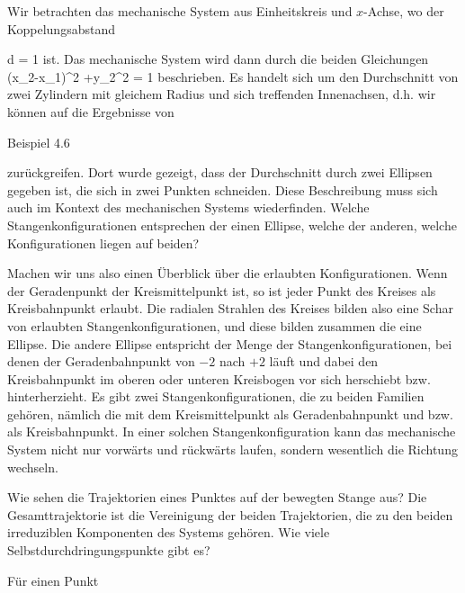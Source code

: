 {





Wir betrachten das mechanische System aus Einheitskreis und $x$-Achse, wo der Koppelungsabstand

\mavergleichskette
{\vergleichskette
{ d
}
{ = }{ 1
}
{  }{
}
{    }{
}
{   }{
}
}
{}{}{}
ist. Das mechanische System wird dann durch die beiden Gleichungen
 {
\mavergleichskette
{\vergleichskette
{ (x_2-x_1)^2 +y_2^2
}
{ = }{ 1
}
{  }{
}
{    }{
}
{   }{
}
}
{}{}{}
}
beschrieben. Es handelt sich um den Durchschnitt von zwei Zylindern mit gleichem Radius und sich treffenden Innenachsen, d.h. wir können auf die Ergebnisse von

Beispiel 4.6

zurückgreifen. Dort wurde gezeigt, dass der Durchschnitt durch zwei Ellipsen gegeben ist, die sich in zwei Punkten schneiden. Diese Beschreibung muss sich auch im Kontext des mechanischen Systems wiederfinden. Welche Stangenkonfigurationen entsprechen der einen Ellipse, welche der anderen, welche Konfigurationen liegen auf beiden?

Machen wir uns also einen Überblick über die erlaubten Konfigurationen. Wenn der Geradenpunkt
 {} {} der Kreismittelpunkt ist, so ist jeder Punkt des Kreises als Kreisbahnpunkt erlaubt. Die radialen Strahlen des Kreises bilden also eine Schar von erlaubten Stangenkonfigurationen, und diese bilden zusammen die eine Ellipse. Die andere Ellipse entspricht der Menge der Stangenkonfigurationen, bei denen der Geradenbahnpunkt von $-2$ nach $+2$ läuft und dabei den Kreisbahnpunkt im oberen oder unteren Kreisbogen vor sich herschiebt bzw. hinterherzieht. Es gibt zwei Stangenkonfigurationen, die zu beiden Familien gehören, nämlich die mit dem Kreismittelpunkt als Geradenbahnpunkt und
 bzw.
 als Kreisbahnpunkt. In einer solchen Stangenkonfiguration kann das mechanische System nicht nur vorwärts und rückwärts laufen, sondern wesentlich die Richtung wechseln.

Wie sehen die Trajektorien eines Punktes auf der bewegten Stange aus? Die Gesamttrajektorie ist die Vereinigung der beiden Trajektorien, die zu den beiden irreduziblen Komponenten des Systems gehören. Wie viele Selbstdurchdringungspunkte gibt es?

Für einen Punkt

}
